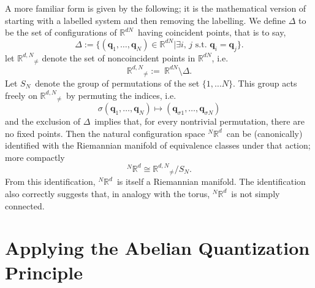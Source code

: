 \documentclass[11pt]{article}
\theoremstyle{remark}
\begin{document}
A more familiar form is given by the following; it is the mathematical
version of starting with a labelled system and then removing the labelling.  
We define $\ensuremath{\ensuremath{\Delta}}$ to be the set of configurations of \ensuremath{\mathbb{R}^{\ensuremath{d} N}}\ having
coincident points, that is to say,  
\begin{equation*}
\ensuremath{\ensuremath{\Delta}} \ensuremath{:=} \ensuremath{\{ \ensuremath{(\boldsymbol{q}_1,\ldots,\boldsymbol{q}_N)} \in \ensuremath{\mathbb{R}^{\ensuremath{d} N}} | \exists \text{
$i$, $j$ s.t. $\boldsymbol{q}_i = \boldsymbol{q}_j$} \}}. 
\end{equation*}  
let $\ensuremath{\mathbb{R}^{\ensuremath{d},N}}_{\neq}$
 denote the set of noncoincident points in \ensuremath{\mathbb{R}^{\ensuremath{d} N}}, i.e.\ 
\begin{equation*}
\ensuremath{\mathbb{R}^{\ensuremath{d},N}}_{\neq} \ensuremath{:=}\ \ensuremath{\ensuremath{\mathbb{R}^{\ensuremath{d} N}} \setminus \ensuremath{\ensuremath{\Delta}}}. 
\end{equation*}
Let \ensuremath{S_N}\ denote the group of permutations of the set 
$\{ 1, \ldots N \}$. 
This group acts freely on \ensuremath{\ensuremath{\mathbb{R}^{d,N}}_{\neq}}\ by permuting the indices, i.e.\ 
\begin{equation*}
\ensuremath{\sigma} (\boldsymbol{q}_1,\ldots, \boldsymbol{q}_N) \mapsto 
(\boldsymbol{q}_{\ensuremath{\sigma}1},\ldots, \boldsymbol{q}_{\ensuremath{\sigma} N})
\end{equation*} 
and the exclusion of \ensuremath{\ensuremath{\Delta}}\ implies that, for every nontrivial
  permutation, 
there are no fixed points.
Then the natural configuration space \ensuremath{{}^N\ensuremath{\mathbb{R}^{\ensuremath{d}}}}\ can be (canonically)
identified with the Riemannian manifold of equivalence classes under
that action; more compactly
\begin{equation*}
 \ensuremath{{}^N\ensuremath{\mathbb{R}^{\ensuremath{d}}}} \ensuremath{\cong} \ensuremath{\ensuremath{\mathbb{R}^{d,N}}_{\neq}} / \ensuremath{S_N}.
\end{equation*}
From this identification, \ensuremath{{}^N\ensuremath{\mathbb{R}^{\ensuremath{d}}}}\ is itself a Riemannian manifold. 
The identification also correctly suggests that, in analogy with the
torus, \ensuremath{{}^N\ensuremath{\mathbb{R}^{\ensuremath{d}}}}\ 
is not simply connected. 


\section{Applying the Abelian Quantization Principle}
\end{document}
